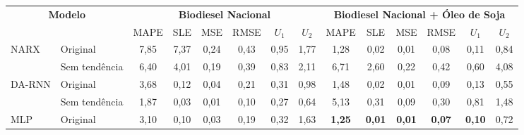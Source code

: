 \begin{tabular}{llcccccccccccc}
	\toprule
	\multicolumn{2}{c}{\textbf{Modelo}} & \multicolumn{6}{c}{\textbf{Biodiesel Nacional}} & \multicolumn{6}{c}{\textbf{Biodiesel Nacional + Óleo de Soja}}                                                                                                                                                                                 \\
	\cmidrule(lr){3-8} \cmidrule(lr){9-14}
	                                    &                                                 & MAPE                                                           & SLE           & MSE           & RMSE          & \(U_1\)       & \(U_2\)       & MAPE          & SLE           & MSE           & RMSE          & \(U_1\)       & \(U_2\)       \\
	\midrule
	\multirow{2}{*}{\ac{NARX}}
	                                    & Original                                        & 7,85                                                           & 7,37          & 0,24          & 0,43          & 0,95          & 1,77          & 1,28          & 0,02          & 0,01          & 0,08          & 0,11          & 0,84          \\
	                                    & Sem tendência                                   & 6,40                                                           & 4,01          & 0,19          & 0,39          & 0,83          & 2,11          & 6,71          & 2,60          & 0,22          & 0,42          & 0,60          & 4,08          \\
	\midrule
	\multirow{2}{*}{\ac{DA-RNN}}
	                                    & Original                                        & 3,68                                                           & 0,12          & 0,04          & 0,21          & 0,31          & 0,98          & 1,48          & 0,02          & 0,01          & 0,09          & 0,13          & 0,55          \\
	                                    & Sem tendência                                   & 1,87                                                           & 0,03          & 0,01          & 0,10          & 0,27          & 0,64          & 5,13          & 0,31          & 0,09          & 0,30          & 0,81          & 1,48          \\
	\midrule
	\multirow{2}{*}{\ac{MLP}}
	                                    & Original                                        & 3,10                                                           & 0,10          & 0,03          & 0,19          & 0,32          & 1,63          & \textbf{1,25} & \textbf{0,01} & \textbf{0,01} & \textbf{0,07} & \textbf{0,10} & 0,72          \\

\end{tabular}
